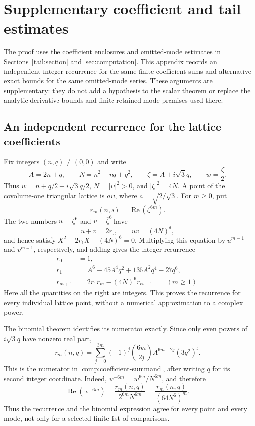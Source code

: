 \section{Supplementary coefficient and tail estimates}
\label{sec:scientific-support}

The proof uses the coefficient enclosures and omitted-mode estimates
in Sections~\ref{tail:section} and \ref{sec:computation}.  This appendix
records an independent integer recurrence for the same finite coefficient
sums and alternative exact bounds for the same omitted-mode series.  These
arguments are supplementary: they do not add a hypothesis to the scalar
theorem or replace the analytic derivative bounds and finite retained-mode
premises used there.

\subsection{An independent recurrence for the lattice coefficients}
\label{supp:coefficient-recurrence}

Fix integers $(n,q)\ne(0,0)$ and write
\[
 A=2n+q,\qquad N=n^2+nq+q^2,\qquad
 \zeta=A+i\sqrt3q,\qquad w=\frac{\zeta}{2}.
\]
Thus $w=n+q/2+i\sqrt3q/2$, $N=|w|^2>0$, and
$|\zeta|^2=4N$.  A point of the covolume-one triangular lattice is
$aw$, where $a=\sqrt{2/\sqrt3}$.  For $m\geq0$, put
\[
 r_m(n,q)=\operatorname{Re}(\zeta^{6m}).
\]
The two numbers $u=\zeta^6$ and $v=\overline{\zeta}^{6}$ have
\[
 u+v=2r_1,\qquad uv=(4N)^6,
\]
and hence satisfy $X^2-2r_1X+(4N)^6=0$.  Multiplying this equation
by $u^{m-1}$ and $v^{m-1}$, respectively, and adding gives the integer
recurrence
\begin{equation}
 \begin{split}
 r_0&=1,\\
 r_1&=A^6-45A^4q^2+135A^2q^4-27q^6,\\
 r_{m+1}&=2r_1r_m-(4N)^6r_{m-1}\qquad(m\geq1).
 \end{split}
 \label{supp:real-recurrence}
\end{equation}
Here all the quantities on the right are integers.  This proves the
recurrence for every individual lattice point, without a numerical
approximation to a complex power.

The binomial theorem identifies its numerator exactly.  Since only even
powers of $i\sqrt3q$ have nonzero real part,
\begin{equation}
 r_m(n,q)=\sum_{j=0}^{3m}(-1)^j\binom{6m}{2j}
                 A^{6m-2j}(3q^2)^j.
 \label{supp:binomial-numerator}
\end{equation}
This is the numerator in \eqref{comp:coefficient-summand}, after writing
$q$ for its second integer coordinate.  Indeed,
$w^{-6m}=\overline{w}^{6m}/N^{6m}$, and therefore
\begin{equation}
 \operatorname{Re}(w^{-6m})
 =\frac{r_m(n,q)}{2^{6m}N^{6m}}
 =\frac{r_m(n,q)}{(64N^6)^m}.
 \label{supp:reciprocal-power}
\end{equation}
Thus the recurrence and the binomial expression agree for every point and
every mode, not only for a selected finite list of comparisons.

